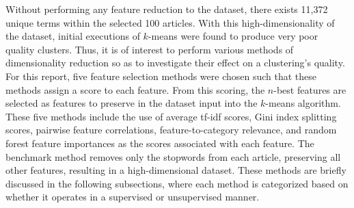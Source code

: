 \documentclass[11pt]{article}
\begin{document}
Without performing any feature reduction to the dataset, there exists 11,372 unique terms within the selected 100 articles.
With this high-dimensionality of the dataset, initial executions of $k$-means were found to produce very poor quality clusters.
Thus, it is of interest to perform various methods of dimensionality reduction so as to investigate their effect on a clustering's quality.
For this report, five feature selection methods were chosen such that these methods assign a score to each feature.
From this scoring, the $n$-best features are selected as features to preserve in the dataset input into the $k$-means algorithm.
These five methods include the use of average tf-idf scores, Gini index splitting scores, pairwise feature correlations, feature-to-category relevance, and random forest feature importances as the scores associated with each feature.
The benchmark method removes only the stopwords from each article, preserving all other features, resulting in a high-dimensional dataset.
These methods are briefly discussed in the following subsections, where each method is categorized based on whether it operates in a supervised or unsupervised manner.
\end{document}
